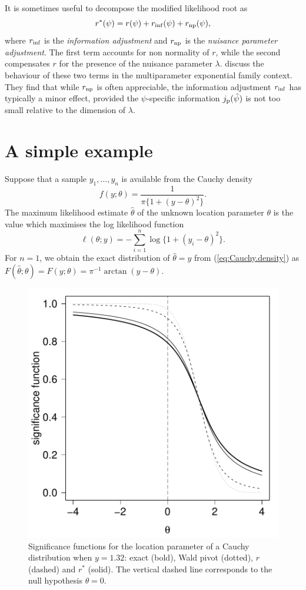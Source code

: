 \documentclass[a4paper,11pt]{article}
\begin{document}
It is sometimes useful to decompose the modified likelihood root as
%
\[
r^*(\psi) = r(\psi) + r_{\rm inf}(\psi) + r_{\rm np}(\psi),
\]
%
where $r_{\rm inf}$ is the \emph{information adjustment} and $r_{\rm np}$ is the \emph{nuisance parameter adjustment}.  The first term accounts for non normality of $r$, while the second compensates $r$ for the presence of the nuisance parameter $\lambda$.  \citet[Section~3]{pierce.peters:1992} discuss the behaviour of these two terms in the multiparameter exponential family context.  They find that while $r_{\rm np}$ is often appreciable, the information adjustment $r_{\rm inf}$ has typically a minor effect, provided the $\psi$-specific information $j_{\rm p}(\hat\psi)$ is not too small relative to the dimension of $\lambda$.  


\section*{A simple example}
%
Suppose that a sample $y_1, \ldots, y_n$ is available from the Cauchy density
%
\begin{equation}
\label{eq:Cauchy.density}
f(y;\theta) = \frac{1}{\pi\{1+(y-\theta)^2\}}.
\end{equation}
%
The maximum likelihood estimate $\hat\theta$ of the unknown location parameter $\theta$ is the value which maximises the log likelihood function
%
\[
\ell(\theta;y) = - \sum_{i=1}^{n}\log\{1+(y_i-\theta)^2\}.
\]
For $n=1$, we obtain the exact distribution of $\hat\theta = y$ from (\ref{eq:Cauchy.density}) as $F(\hat\theta;\theta) = F(y;\theta) = \pi^{-1}\arctan(y-\theta)$. 

\begin{figure}[htp]
\includegraphics{Rnews-paper-001}
\caption{
Significance functions for the location parameter of a Cauchy distribution when $y = 1.32$: exact (bold), Wald pivot (dotted), $r$ (dashed) and $r^*$ (solid).  The vertical dashed line corresponds to the null hypothesis $\theta = 0$.}
\label{fig:signif.Cauchy}
\end{figure}
\end{document}
